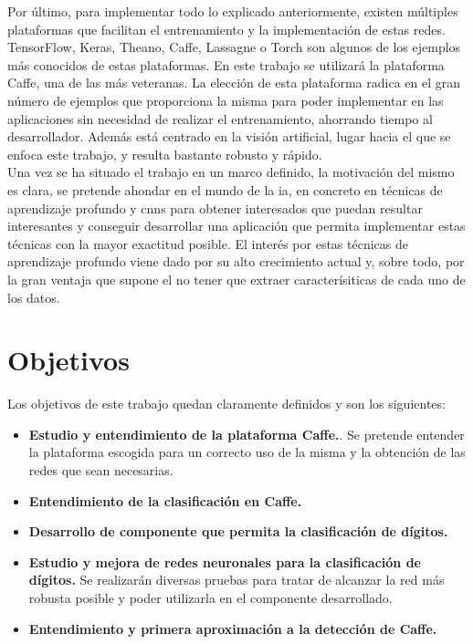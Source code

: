 Por último, para implementar todo lo explicado anteriormente, existen múltiples plataformas que facilitan el entrenamiento y la implementación de estas redes. TensorFlow, Keras, Theano, Caffe, Lassagne o Torch son algunos de los ejemplos más conocidos de estas plataformas. En este trabajo se utilizará la plataforma Caffe, una de las más veteranas. La elección de esta plataforma radica en el gran número de ejemplos que proporciona la misma para poder implementar en las aplicaciones sin necesidad de realizar el entrenamiento, ahorrando tiempo al desarrollador. Además está centrado en la visión artificial, lugar hacia el que se enfoca este trabajo, y resulta bastante robusto y rápido.\\

Una vez se ha situado el trabajo en un marco definido, la motivación del mismo es clara, se pretende ahondar en el mundo de la \acrshort{ia}, en concreto en técnicas de aprendizaje profundo y \acrshort{cnn}s para obtener interesados que puedan resultar interesantes y conseguir desarrollar una aplicación que permita implementar estas técnicas con la mayor exactitud posible. El interés por estas técnicas de aprendizaje profundo viene dado por su alto crecimiento actual y, sobre todo, por la gran ventaja que supone el no tener que extraer caracterísiticas de cada uno de los datos.

\section{Objetivos}
Los objetivos de este trabajo quedan claramente definidos y son los siguientes:
\begin{itemize}
	\item \textbf{Estudio y entendimiento de la plataforma Caffe.}. Se pretende entender la plataforma escogida para un correcto uso de la misma y la obtención de las redes que sean necesarias.
	\item \textbf{Entendimiento de la clasificación en Caffe.}
	\item \textbf{Desarrollo de componente que permita la clasificación de dígitos.}
	\item \textbf{Estudio y mejora de redes neuronales para la clasificación de dígitos.} Se realizarán diversas pruebas para tratar de alcanzar la red más robusta posible y poder utilizarla en el componente desarrollado.
	\item \textbf{Entendimiento y primera aproximación a la detección de Caffe.}
\end{itemize}

